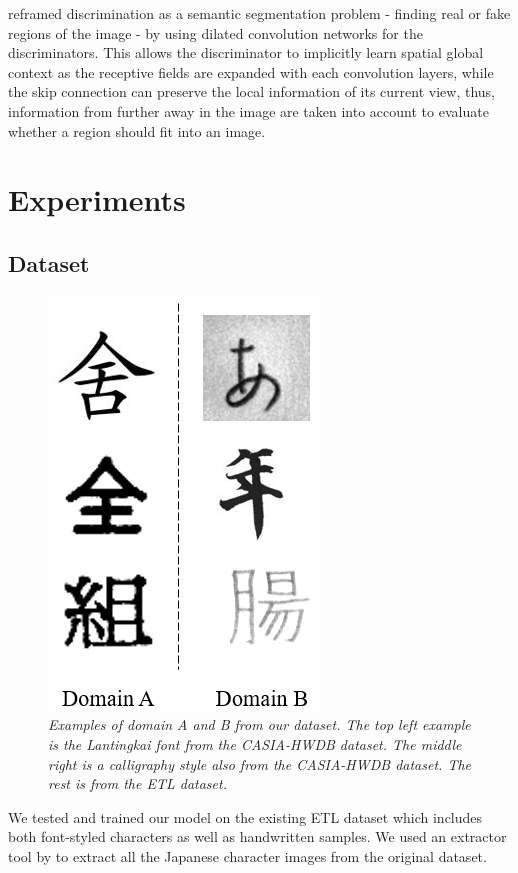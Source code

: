 \documentclass[12pt]{report}
\begin{document}
\cite{ganimorph} reframed discrimination as a semantic segmentation problem - finding real or fake regions of the image - by using dilated convolution networks for the discriminators. This allows the discriminator to implicitly learn spatial global context as the receptive fields are expanded with each convolution layers, while the skip connection can preserve the local information of its current view, thus, information from further away in the image are taken into account to evaluate whether a region should fit into an image.

\chapter{Experiments}
\label{chap:experiments}
\section{Dataset}

\begin{figure}[h]
	\centering
	\includegraphics[scale=0.9]{data-examples}
	\caption{\textit{Examples of domain A and B from our dataset. The top left example is the Lantingkai font from the CASIA-HWDB\cite{casia} dataset. The middle right is a calligraphy style also from the CASIA-HWDB dataset. The rest is from the ETL\cite{etl} dataset.}}
	\label{fig:data-examples}
\end{figure}

We tested and trained our model on the existing ETL dataset\cite{etl} which includes both font-styled characters as well as handwritten samples. We used an extractor tool by \cite{etl-extractor} to extract all the Japanese character images from the original dataset.
\end{document}
